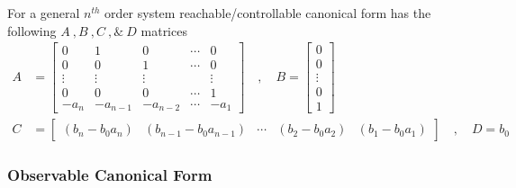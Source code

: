 \documentclass[twoside]{article}
\begin{document}
For a general $n^{th}$ order system reachable/controllable
canonical form has the following $A \ ,  B \ ,  C \ , \& \ D$
matrices
%
\begin{align*}
A &= \left[ \begin{array}{ccccc} 0 & 1 & 0 & \cdots & 0 \\ 0 & 0 & 1 &
                                                                      \cdots & 0
\\ \vdots & \vdots & \vdots & & \vdots
\\ 0 & 0 & 0 & \cdots & 1
    \\ -a_n & -a_{n-1} & -a_{n-2} & \cdots & -a_1 \end{array} \right]
\quad , \quad 
B = \left[ \begin{array}{c} 0\\ 0 \\ \vdots \\ 0
    \\ 1 \end{array} \right]
\\ C &= \left[ \begin{array}{ccccc} (b_n - b_0 a_n) 
  &  (b_{n-1} - b_0 a_{n-1}) & \cdots &  (b_2 - b_0 a_2) &
   (b_1 - b_0 a_1) \end{array} \right]
\quad , \quad
D = b_0
\end{align*}

\subsubsection*{Observable Canonical Form}
\end{document}
